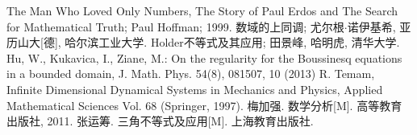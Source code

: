 \begin{thebibliography}{}
  The Man Who Loved Only Numbers, The Story of Paul Erdos and The Search for Mathematical Truth; Paul Hoffman; 1999.
  数域的上同调; 尤尔根$\cdot$诺伊基希, 亚历山大[德], 哈尔滨工业大学.
  Holder不等式及其应用; 田景峰, 哈明虎, 清华大学.
  Hu, W., Kukavica, I., Ziane, M.: On the regularity for the Boussinesq equations in a bounded domain, J. Math. Phys. 54(8), 081507, 10 (2013)
  R. Temam, Infinite Dimensional Dynamical Systems in Mechanics and Physics, Applied Mathematical Sciences Vol. 68
 (Springer, 1997).
  梅加强. 数学分析[M]. 高等教育出版社, 2011.
  张运筹. 三角不等式及应用[M]. 上海教育出版社.
\end{thebibliography}
